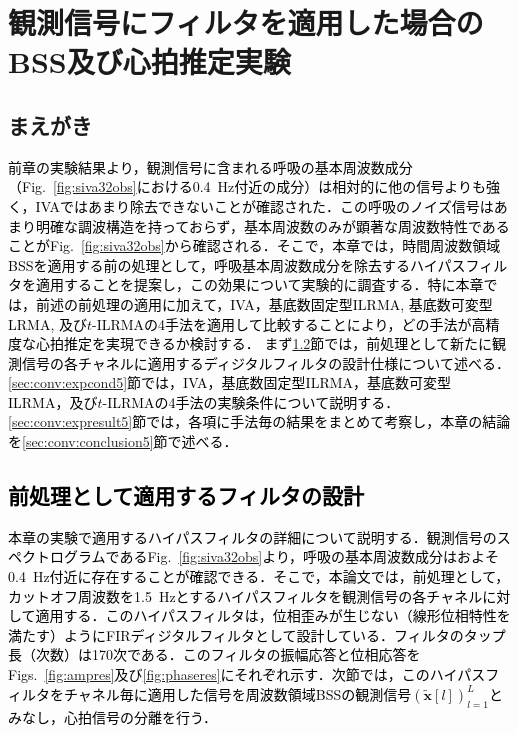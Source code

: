 \chapter{観測信号にフィルタを適用した場合のBSS及び心拍推定実験}
\label{chap:fbsshrexp}

\section{まえがき}
\textcolor{black}{前章の実験結果より，観測信号に含まれる呼吸の基本周波数成分（Fig.~\ref{fig:siva32obs}における0.4~Hz付近の成分）は相対的に他の信号よりも強く，IVAではあまり除去できないことが確認された．この呼吸のノイズ信号はあまり明確な調波構造を持っておらず，基本周波数のみが顕著な周波数特性であることがFig.~\ref{fig:siva32obs}から確認される．そこで，本章では，時間周波数領域BSSを適用する前の処理として，呼吸基本周波数成分を除去するハイパスフィルタを適用することを提案し，この効果について実験的に調査する．特に本章では，前述の前処理の適用に加えて，IVA，基底数固定型ILRMA, 基底数可変型LRMA, 及び$t$-ILRMAの4手法を適用して比較することにより，どの手法が高精度な心拍推定を実現できるか検討する．
まず\ref{sec:conv:filteroutline}節では，前処理として新たに観測信号の各チャネルに適用するディジタルフィルタの設計仕様について述べる．\ref{sec:conv:expcond5}節では，IVA，基底数固定型ILRMA，基底数可変型ILRMA，及び$t$-ILRMAの4手法の実験条件について説明する．\ref{sec:conv:expresult5}節では，各項に手法毎の結果をまとめて考察し，本章の結論を\ref{sec:conv:conclusion5}節で述べる．}

\section{\textcolor{black}{前処理として適用するフィルタの設計}}
\label{sec:conv:filteroutline}
\textcolor{black}{本章の実験で適用するハイパスフィルタの詳細について説明する．観測信号のスペクトログラムであるFig.~\ref{fig:siva32obs}より，呼吸の基本周波数成分はおよそ0.4~Hz付近に存在することが確認できる．そこで，本論文では，前処理として，カットオフ周波数を1.5~Hzとするハイパスフィルタを観測信号の各チャネルに対して適用する．このハイパスフィルタは，位相歪みが生じない（線形位相特性を満たす）ようにFIRディジタルフィルタとして設計している．フィルタのタップ長（次数）は170次である．このフィルタの振幅応答と位相応答をFigs.~\ref{fig:ampres}及び\ref{fig:phaseres}にそれぞれ示す．次節では，このハイパスフィルタをチャネル毎に適用した信号を周波数領域BSSの観測信号$( \tilde{\bm{x}}[l] )_{l=1}^L$とみなし，心拍信号の分離を行う．}

